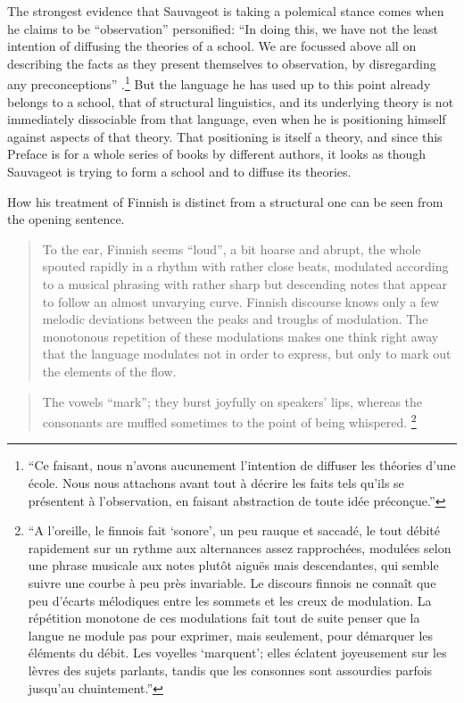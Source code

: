 \documentclass[output=paper]{langscibook}
\begin{document}
The strongest evidence that Sauvageot is taking a polemical stance comes when he claims to be ``observation'' personified: ``In doing this, we have not the least intention of diffusing the theories of a school. We are focussed above all on describing the facts as they present themselves to observation, by disregarding any preconceptions'' \citep[7--8]{Sauvageot1946}.\footnote{``Ce faisant, nous n'avons aucunement l'intention de diffuser les théories d'une école. Nous nous attachons avant tout à décrire les faits tels qu'ils se présentent à l'observation, en faisant abstraction de toute idée préconçue.''} But the language he has used up to this point already belongs to a school, that of structural linguistics, and its underlying theory is not immediately dissociable from that language, even when he is positioning himself against aspects of that theory. That positioning is itself a theory, and since this Preface is for a whole series of books by different authors, it looks as though Sauvageot is trying to form a school and to diffuse its theories.

How his treatment of Finnish is distinct from a structural one can be seen from the opening sentence. 

\begin{quotation}
To the ear, Finnish seems ``loud'', a bit hoarse and abrupt, the whole spouted rapidly in a rhythm with rather close beats, modulated according to a musical phrasing with rather sharp but descending notes that appear to follow an almost unvarying curve. Finnish discourse knows only a few melodic deviations between the peaks and troughs of modulation. The monotonous repetition of these modulations makes one think right away that the language modulates not in order to express, but only to mark out the elements of the flow.
\end{quotation}

\begin{quotation}
The vowels ``mark''; they burst joyfully on speakers' lips, whereas the consonants are muffled sometimes to the point of being whispered. \citep[15]{Sauvageot1946}\footnote{``A l'oreille, le finnois fait `sonore', un peu rauque et saccadé, le tout débité rapidement sur un rythme aux alternances assez rapprochées, modulées selon une phrase musicale aux notes plutôt aiguës mais descendantes, qui semble suivre une courbe à peu près invariable. Le discours finnois ne connaît que peu d'écarts mélodiques entre les sommets et les creux de modulation. La répétition monotone de ces modulations fait tout de suite penser que la langue ne module pas pour exprimer, mais seulement, pour démarquer les éléments du débit. Les voyelles `marquent'; elles éclatent joyeusement sur les lèvres des sujets parlants, tandis que les consonnes sont assourdies parfois jusqu'au chuintement.''}
\end{quotation}
\end{document}
